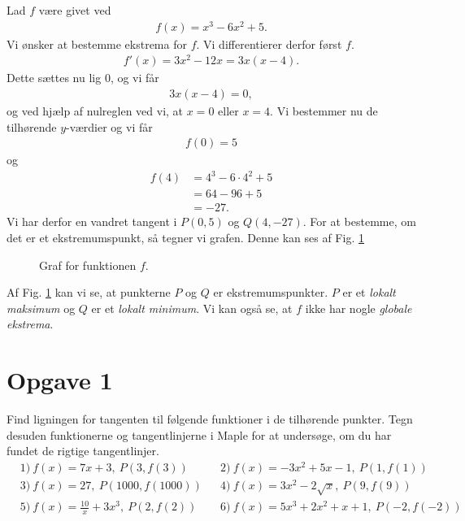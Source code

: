 \begin{exa}
	Lad $f$ være givet ved
	\begin{align*}
		f(x) = x^3-6x^2+5.
	\end{align*}
	Vi ønsker at bestemme ekstrema for $f$. Vi differentierer derfor først $f$.
	\begin{align*}
		f'(x) = 3x^2-12x = 3x(x-4).
	\end{align*}
	Dette sættes nu lig $0$, og vi får
	\begin{align*}
		3x(x-4) = 0, 
	\end{align*}
	og ved hjælp af nulreglen ved vi, at $x=0$ eller $x = 4$. Vi bestemmer nu de tilhørende $y$-værdier og vi får
	\begin{align*}
		f(0) = 5
	\end{align*}
	og 
	\begin{align*}
		f(4) &= 4^3 - 6\cdot 4^2+5\\
		&= 64-96+5\\
		&= -27.
	\end{align*}
	Vi har derfor en vandret tangent i $P(0,5)$ og $Q(4,-27)$. For at bestemme, om det er et ekstremumspunkt, så tegner vi grafen. Denne kan ses af Fig. \ref{fig:ekstrema}
	\begin{figure}[H]
		\centering
		\caption{Graf for funktionen $f$.}
		\label{fig:ekstrema}
	\end{figure}
\end{exa}
Af Fig. \ref{fig:ekstrema} kan vi se, at punkterne $P$ og $Q$ er ekstremumspunkter. $P$ er et \textit{lokalt maksimum} og $Q$ er et \textit{lokalt minimum}. Vi kan også se, at $f$ ikke har nogle 
\textit{globale ekstrema}.


\section*{Opgave 1}
Find ligningen for tangenten til følgende funktioner i de tilhørende punkter. Tegn desuden funktionerne og tangentlinjerne i Maple for at undersøge, om du har fundet de rigtige tangentlinjer. 
\begin{align*}
&1) \ f(x) = 7x+3,\ P(3,f(3))   &&2) \ f(x) = -3x^2+5x-1, \ P(1,f(1))     \\
&3) \ f(x) = 27, \ P(1000,f(1000))   &&4) \ f(x) = 3x^2-2\sqrt{x}, \ P(9,f(9))     \\
&5) \ f(x) = \frac{10}{x}+3x^3, \ P(2,f(2))   &&6) \ f(x) = 5x^3+2x^2+x+1, \ P(-2,f(-2))     \\
\end{align*}

